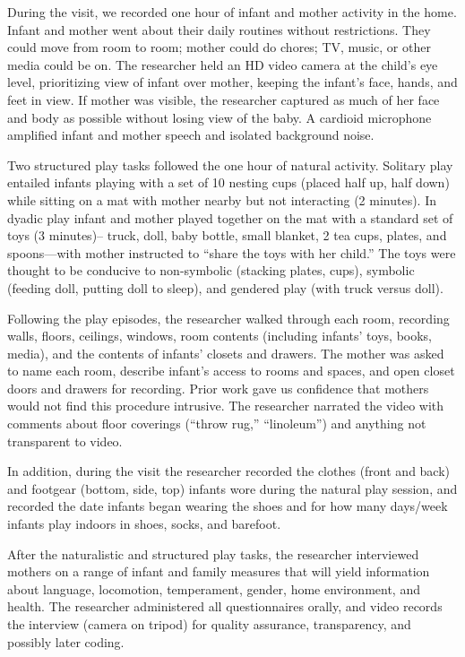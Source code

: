 \documentclass[english,man]{apa6}
\theoremstyle{definition}
\theoremstyle{definition}
\theoremstyle{definition}
\theoremstyle{remark}
\begin{document}
During the visit, we recorded one hour of infant and mother activity in
the home. Infant and mother went about their daily routines without
restrictions. They could move from room to room; mother could do chores;
TV, music, or other media could be on. The researcher held an HD video
camera at the child's eye level, prioritizing view of infant over
mother, keeping the infant's face, hands, and feet in view. If mother
was visible, the researcher captured as much of her face and body as
possible without losing view of the baby. A cardioid microphone
amplified infant and mother speech and isolated background noise.

Two structured play tasks followed the one hour of natural activity.
Solitary play entailed infants playing with a set of 10 nesting cups
(placed half up, half down) while sitting on a mat with mother nearby
but not interacting (2 minutes). In dyadic play infant and mother played
together on the mat with a standard set of toys (3 minutes)-- truck,
doll, baby bottle, small blanket, 2 tea cups, plates, and spoons---with
mother instructed to \enquote{share the toys with her child.} The toys
were thought to be conducive to non-symbolic (stacking plates, cups),
symbolic (feeding doll, putting doll to sleep), and gendered play (with
truck versus doll).

Following the play episodes, the researcher walked through each room,
recording walls, floors, ceilings, windows, room contents (including
infants' toys, books, media), and the contents of infants' closets and
drawers. The mother was asked to name each room, describe infant's
access to rooms and spaces, and open closet doors and drawers for
recording. Prior work gave us confidence that mothers would not find
this procedure intrusive. The researcher narrated the video with
comments about floor coverings (\enquote{throw rug,} \enquote{linoleum})
and anything not transparent to video.

In addition, during the visit the researcher recorded the clothes (front
and back) and footgear (bottom, side, top) infants wore during the
natural play session, and recorded the date infants began wearing the
shoes and for how many days/week infants play indoors in shoes, socks,
and barefoot.

After the naturalistic and structured play tasks, the researcher
interviewed mothers on a range of infant and family measures that will
yield information about language, locomotion, temperament, gender, home
environment, and health. The researcher administered all questionnaires
orally, and video records the interview (camera on tripod) for quality
assurance, transparency, and possibly later coding.
\end{document}
